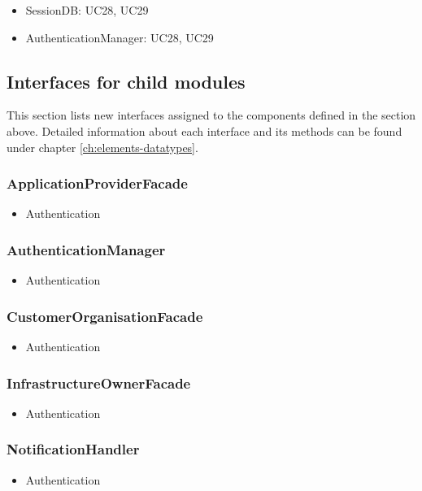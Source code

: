     \begin{itemize}
        \item SessionDB: UC28, UC29
        \item AuthenticationManager: UC28, UC29
    \end{itemize}


\subsection{Interfaces for child modules}
    This section lists new interfaces assigned to the components defined
    in the section above. Detailed information about each interface and
    its methods can be found under chapter \ref{ch:elements-datatypes}.

    \subsubsection{ApplicationProviderFacade}
        \begin{itemize}
            \item Authentication
        \end{itemize}

    \subsubsection{AuthenticationManager}
        \begin{itemize}
            \item Authentication
        \end{itemize}

    \subsubsection{CustomerOrganisationFacade}
        \begin{itemize}
            \item Authentication
        \end{itemize}

    \subsubsection{InfrastructureOwnerFacade}
        \begin{itemize}
            \item Authentication
        \end{itemize}

    \subsubsection{NotificationHandler}
        \begin{itemize}
            \item Authentication
        \end{itemize}

